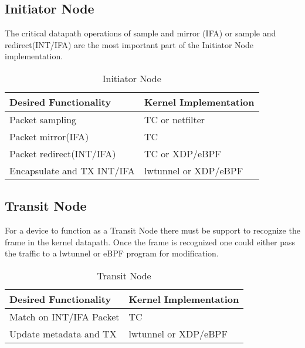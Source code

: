 \documentclass[letterpaper,twocolumn,10pt]{article}
\begin{document}
\subsection{Initiator Node}
The critical datapath operations of sample and mirror (IFA) or sample
and redirect(INT/IFA) are the most important part of the Initiator Node
implementation.

\begin{table}[h!]
  \begin{center}
    \caption{Initiator Node}
    \label{tab:table1}
    \begin{tabular}{l|l}
      \textbf{Desired Functionality} & \textbf{Kernel Implementation} \\
      \hline
      Packet sampling & TC or netfilter \\
      \hline
      Packet mirror(IFA) & TC \\
      \hline
      Packet redirect(INT/IFA) & TC or XDP/eBPF \\
      \hline
      Encapsulate and TX INT/IFA & lwtunnel or XDP/eBPF \\
    \end{tabular}
  \end{center}
\end{table}


\subsection{Transit Node}
For a device to function as a Transit Node there must be support to
recognize the frame in the kernel datapath.  Once the frame is
recognized one could either pass the traffic to a lwtunnel or eBPF
program for modification.

\begin{table}[h!]
  \begin{center}
    \caption{Transit Node}
    \label{tab:table2}
    \begin{tabular}{l|l}
      \textbf{Desired Functionality} & \textbf{Kernel Implementation} \\
      \hline
      Match on INT/IFA Packet & TC \\
      \hline
      Update metadata and TX & lwtunnel or XDP/eBPF \\
    \end{tabular}
  \end{center}
\end{table}
\end{document}
